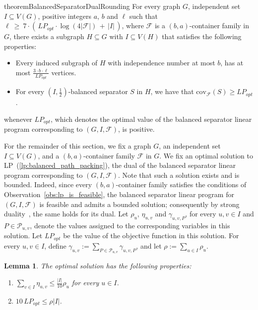 \documentclass[11pt]{amsart}
\newtheorem{lemma}[theorem]{Lemma}
\newcommand{\lpopt}{LP_{opt}}
\begin{document}
\begin{restatable}{theorem}{BalancedSeparatorDualRounding}\label{thm:balanced_separator_dual_rounding}
    For every graph $G$, independent set $I \subseteq V(G)$, positive integers $a$, $b$ and $\ell$ such that $\ell\ \geq\ 7 \cdot (\,\lpopt \cdot \log (4|\mathcal{F}|)\, +\, |I|\,)$, where $\mathcal{F}$ is a $(b,a)$-container family in $G$, there exists a subgraph $H \subseteq G$ with $I \subseteq V(H)$ that satisfies the following properties:
    \begin{itemize}
        \item Every induced subgraph of $H$ with independence number at most $b$, has at most $\frac{3 \cdot b \cdot \ell}{\lpopt}$ vertices.
        \item For every $(I,\frac{1}{2})$-balanced separator $S$ in $H$, we have that $\mathrm{cov}_{\mathcal{F}}(S) \geq \lpopt$.
    \end{itemize}
    whenever $\lpopt$, which denotes the optimal value of the balanced separator linear program corresponding to $(G, I, \mathcal{F})$, is positive.
\end{restatable}

For the remainder of this section, we fix a graph $G$, an independent set $I \subseteq V(G)$, and a $(b,a)$-container family $\mathcal{F}$ in $G$. We fix an optimal solution to LP~(\ref{lp:balanced_path_packing}), the dual of the balanced separator linear program corresponding to $(G, I, \mathcal{F})$. Note that such a solution exists and is bounded. Indeed, since every $(b,a)$-container family satisfies the conditions of Observation~\ref{obs:lp_is_feasible}, the balanced separator linear program for $(G, I, \mathcal{F})$ is feasible and admits a bounded solution; consequently by strong duality~\cite{doi:10.1137/1025101}, the same holds for its dual. Let $\rho_u$, $\eta_{u,v}$ and $\gamma_{u,v,P}$, for every $u,v \in I$ and $P \in \mathcal{P}_{u,v}$, denote the values assigned to the corresponding variables in this solution. Let $\lpopt$ be the value of the objective function in this solution. For every $u, v \in I$, define $\gamma_{u,v} := \sum_{P \in \mathcal{P}_{u,v}} \gamma_{u,v,P}$, and let $\rho := \sum_{u \in I} \rho_u$. 


\begin{lemma}\label{lem:properties_of_dual_lp}
    The optimal solution has the following properties:
    \begin{enumerate}
        \item $\sum_{v\in I}\eta_{u,v} \leq \frac{|I|}{10}\rho_u$ for every $u\in I$.
        \item $10\,\lpopt \leq \rho|I|$.
    \end{enumerate}
\end{lemma}
\end{document}
